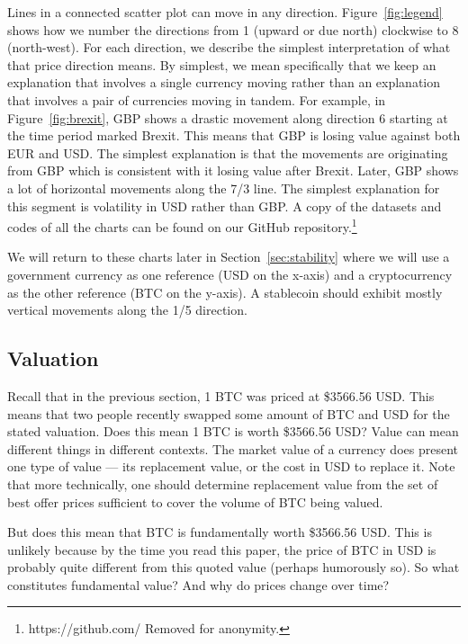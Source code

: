 Lines in a connected scatter plot can move in any direction. Figure~\ref{fig:legend} shows how we number the directions from 1 (upward or due north) clockwise to 8 (north-west). For each direction, we describe the simplest interpretation of what that price direction means. By simplest, we mean specifically that we keep an explanation that involves a single currency moving rather than an explanation that involves a pair of currencies moving in tandem. For example, in Figure~\ref{fig:brexit}, GBP shows a drastic movement along direction 6 starting at the time period marked Brexit. This means that GBP is losing value against both EUR and USD. The simplest explanation is that the movements are originating from GBP which is consistent with it losing value after Brexit. Later, GBP shows a lot of horizontal movements along the 7/3 line. The simplest explanation for this segment is volatility in USD rather than GBP.
A copy of the datasets and codes of all the charts can be found on our GitHub repository.\footnote{https://github.com/ Removed for anonymity.}

We will return to these charts later in Section~\ref{sec:stability} where we will use a government currency as one reference (USD on the x-axis) and a cryptocurrency as the other reference (BTC on the y-axis). A stablecoin should exhibit mostly vertical movements along the 1/5 direction.

\subsection{Valuation}

Recall that in the previous section, 1 BTC was priced at \$3566.56 USD. This means that two people recently swapped some amount of BTC and USD for the stated valuation. Does this mean 1 BTC is worth \$3566.56 USD? Value can mean different things in different contexts. The market value of a currency does present one type of value --- its replacement value, or the cost in USD to replace it. Note that more technically, one should  determine replacement value from the set of best offer prices sufficient to cover the volume of BTC being valued.

But does this mean that BTC is fundamentally worth \$3566.56 USD. This is unlikely because by the time you read this paper, the price of BTC in USD is probably quite different from this quoted value (perhaps humorously so). So what constitutes fundamental value? And why do prices change over time?

